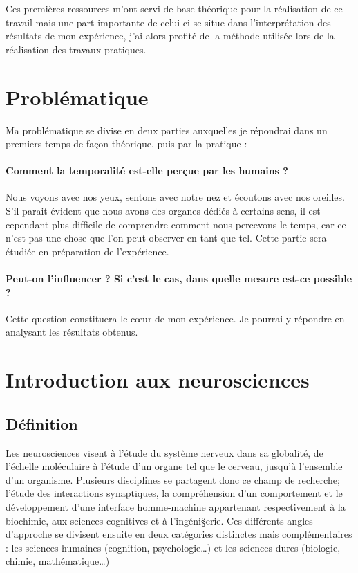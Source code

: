 \documentclass[12pt,fleqn,oneside]{book} %
\begin{document}
Ces premières ressources m'ont servi de base théorique pour la réalisation de ce travail mais une part importante de celui-ci se situe dans l'interprétation des résultats de mon expérience, j'ai alors profité de la méthode utilisée lors de la réalisation des travaux pratiques.

\section{Problématique}
Ma problématique se divise en deux parties auxquelles je répondrai dans un premiers temps de façon théorique, puis par la pratique :

\paragraph{Comment la temporalité est-elle perçue par les humains ?} Nous voyons avec nos yeux, sentons avec notre nez et écoutons avec nos oreilles. S'il parait évident que nous avons des organes dédiés à certains sens, il est cependant plus difficile de comprendre comment nous percevons le temps, car ce n'est pas une chose que l'on peut observer en tant que tel. Cette partie sera étudiée en préparation de l'expérience. 

\paragraph{Peut-on l'influencer ? Si c'est le cas, dans quelle mesure est-ce possible ? } Cette question constituera le cœur de mon expérience. Je pourrai y répondre en analysant les résultats obtenus. 


\section{Introduction aux neurosciences}

\subsection[Définition]{Définition \cite{wikineuro}} %
Les neurosciences visent à l'étude du système nerveux dans sa globalité, de l'échelle moléculaire à l'étude d'un organe tel que le cerveau, jusqu'à l'ensemble d'un organisme. Plusieurs disciplines se partagent donc ce champ de recherche; l'étude des interactions synaptiques, la compréhension d'un comportement et le développement d'une interface homme-machine appartenant respectivement à la biochimie, aux sciences cognitives et à l'ingéni§erie. Ces différents angles d'approche se divisent ensuite en deux catégories distinctes mais complémentaires : les sciences humaines (cognition, psychologie…) et les sciences dures (biologie, chimie, mathématique…) 
\end{document}
